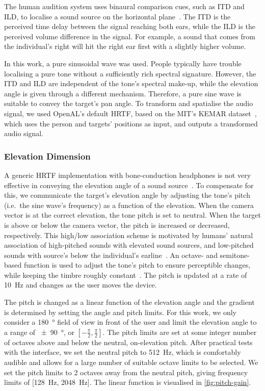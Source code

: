 \documentclass[]{interact}
\begin{document}
The human audition system uses binaural comparison cues, such as ITD and ILD, to localise a sound source on the horizontal plane~\citep{blauert1969sound}.
The ITD is the perceived time delay between the signal reaching both ears, while the ILD is the perceived volume difference in the signal.
For example, a sound that comes from the individual's right will hit the right ear first with a slightly higher volume.

In this work, a pure sinusoidal wave was used. 
People typically have trouble localising a pure tone without a sufficiently rich spectral signature.
However, the ITD and ILD are independent of the tone's spectral make-up, while the elevation angle is given through a different mechanism. Therefore, a pure sine wave is suitable to convey the target's pan angle.
To transform and spatialise the audio signal, we used OpenAL's default HRTF, based on the MIT's KEMAR dataset~\citep{hiebert2005openal}, which uses the person and targets' positions as input, and outputs a transformed audio signal.

\subsubsection{Elevation Dimension}

A generic HRTF implementation with bone-conduction headphones is not very effective in conveying the elevation angle of a sound source~\citep{macdonald2006spatial,schonstein2008comparison}.
To compensate for this, we communicate the target's elevation angle by adjusting the tone's pitch (i.e.\ the sine wave's frequency) as a function of the elevation. 
When the camera vector is at the correct elevation, the tone pitch is set to neutral.
When the target is above or below the camera vector, the pitch is increased or decreased, respectively.
This high/low association scheme is motivated by humans' natural association of high-pitched sounds with elevated sound sources, and low-pitched sounds with source's below the individual's earline~\citep{pratt1930spatial,blauert1997spatial}.
An octave- and semitone-based function is used to adjust the tone's pitch to ensure perceptible changes, while keeping the timbre roughly constant~\citep{shepard1964circularity}.
The pitch is updated at a rate of \SI{10}{\hertz} and changes as the user moves the device.

The pitch is changed as a linear function of the elevation angle and the gradient is determined by setting the angle and pitch limits.
For this work, we only consider a \SI{180}{\degree} field of view in front of the user and limit the elevation angle to a range of \SI{\pm90}{\degree}, or $[-\frac{\pi}{2}, \frac{\pi}{2}]$.
The pitch limits are set at some integer number of octaves above and below the neutral, on-elevation pitch.
After practical tests with the interface, we set the neutral pitch to \SI{512}{\hertz}, which is comfortably audible and allows for a large number of suitable octave limits to be selected.
We set the pitch limits to 2 octaves away from the neutral pitch, giving frequency limits of [\SI{128}{\hertz}, \SI{2048}{\hertz}].
The linear function is visualised in \cref{fig:pitch-gain}.
\end{document}
